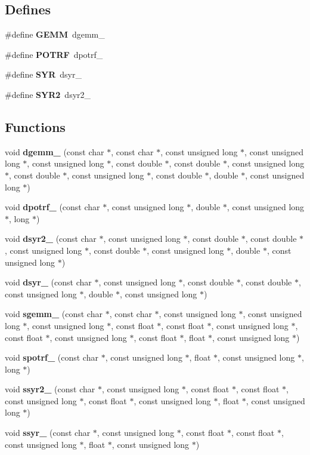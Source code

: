 \subsection*{Defines}
\begin{DoxyCompactItemize}
\item 
\#define {\bf GEMM}~dgemm\_\-
\item 
\#define {\bf POTRF}~dpotrf\_\-
\item 
\#define {\bf SYR}~dsyr\_\-
\item 
\#define {\bf SYR2}~dsyr2\_\-
\end{DoxyCompactItemize}
\subsection*{Functions}
\begin{DoxyCompactItemize}
\item 
void {\bf dgemm\_\-} (const char $\ast$, const char $\ast$, const unsigned long $\ast$, const unsigned long $\ast$, const unsigned long $\ast$, const double $\ast$, const double $\ast$, const unsigned long $\ast$, const double $\ast$, const unsigned long $\ast$, const double $\ast$, double $\ast$, const unsigned long $\ast$)
\item 
void {\bf dpotrf\_\-} (const char $\ast$, const unsigned long $\ast$, double $\ast$, const unsigned long $\ast$, long $\ast$)
\item 
void {\bf dsyr2\_\-} (const char $\ast$, const unsigned long $\ast$, const double $\ast$, const double $\ast$, const unsigned long $\ast$, const double $\ast$, const unsigned long $\ast$, double $\ast$, const unsigned long $\ast$)
\item 
void {\bf dsyr\_\-} (const char $\ast$, const unsigned long $\ast$, const double $\ast$, const double $\ast$, const unsigned long $\ast$, double $\ast$, const unsigned long $\ast$)
\item 
void {\bf sgemm\_\-} (const char $\ast$, const char $\ast$, const unsigned long $\ast$, const unsigned long $\ast$, const unsigned long $\ast$, const float $\ast$, const float $\ast$, const unsigned long $\ast$, const float $\ast$, const unsigned long $\ast$, const float $\ast$, float $\ast$, const unsigned long $\ast$)
\item 
void {\bf spotrf\_\-} (const char $\ast$, const unsigned long $\ast$, float $\ast$, const unsigned long $\ast$, long $\ast$)
\item 
void {\bf ssyr2\_\-} (const char $\ast$, const unsigned long $\ast$, const float $\ast$, const float $\ast$, const unsigned long $\ast$, const float $\ast$, const unsigned long $\ast$, float $\ast$, const unsigned long $\ast$)
\item 
void {\bf ssyr\_\-} (const char $\ast$, const unsigned long $\ast$, const float $\ast$, const float $\ast$, const unsigned long $\ast$, float $\ast$, const unsigned long $\ast$)
\end{DoxyCompactItemize}
